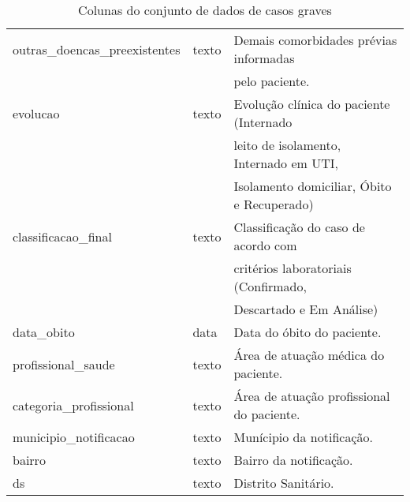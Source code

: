 \begin{table}[H]
\begin{longtable}{lll}
  outras\_doencas\_preexistentes        & texto                               & Demais comorbidades prévias informadas \\ & & pelo paciente.                                                                      \\
  evolucao                              & texto                               & Evolução clínica do paciente (Internado \\ & & leito de isolamento, Internado em UTI, \\ & & Isolamento domiciliar, Óbito e Recuperado) \\
  classificacao\_final                  & texto                               & Classificação do caso de acordo com \\ & & critérios laboratoriais (Confirmado, \\ & & Descartado e Em Análise)                         \\
  data\_obito                           & data                          & Data do óbito do paciente.                                                                                                 \\
  profissional\_saude                   & texto                               & Área de atuação médica do paciente.                                                                                        \\
  categoria\_profissional               & texto                               & Área de atuação profissional do paciente.                                                                                  \\
  municipio\_notificacao                & texto                               & Munícipio da notificação.                                                                                                  \\
  bairro                                & texto                               & Bairro da notificação.                                                                                                     \\
  ds                                    & texto                               & Distrito Sanitário.                                                                                                       
\end{longtable}
\caption{Colunas do conjunto de dados de casos graves}
\label{tbl:tabela-casosgraves}  
\end{table}
